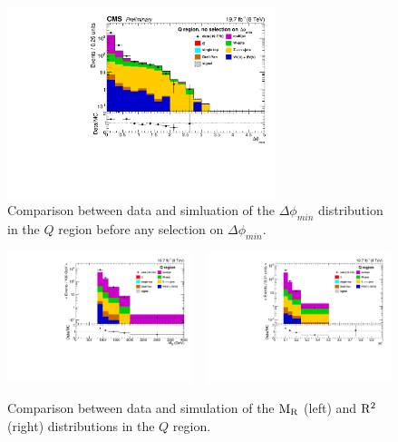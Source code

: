 \begin{figure}[hbp]
\centering
\includegraphics[width=0.7\textwidth]{figures/razor_selection/DataMC_minDeltaPhi_0Lbg1uW0Ll_rebin}
\caption{Comparison between data and simluation of the $\Delta\phi_{min}$ distribution in the $Q$
region before any selection on $\Delta\phi_{min}$. 
\label{fig:boost_Q_region_mindeltaphi}}
\end{figure}

\begin{figure}[htbp]
\centering
\includegraphics[width=0.48\textwidth]
{figures/razor_selection/plots/DataMC_MR_0Lbg1uW0Ll_mdPhi0p3_width}
~
\includegraphics[width=0.48\textwidth]
{figures/razor_selection/plots/DataMC_R2_0Lbg1uW0Ll_mdPhi0p3_width}
\caption{Comparison between data and simulation of the $\mathrm{M_R}$ (left) and $\mathrm{R^2}$ (right)
distributions in the $Q$ region. 
\label{fig:boost_Q_region_MR_Rsq}}
\end{figure}

